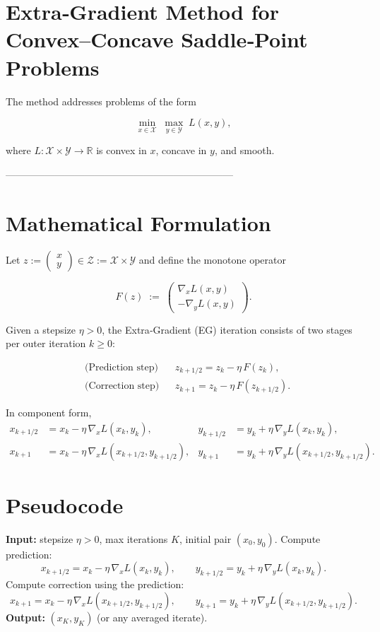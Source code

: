 \documentclass{article}
\newcommand{\R}{\mathbb{R}}
\begin{document}
\section*{Extra‑Gradient Method for Convex–Concave Saddle‑Point Problems}

The method addresses problems of the form  

\[
\min_{x\in\mathcal X}\;\max_{y\in\mathcal Y}\;L(x,y),
\]

where $L:\mathcal X\times\mathcal Y\rightarrow\R$ is convex in $x$, concave in $y$, and smooth.  

---------------------------------------------------------------------

\section*{Mathematical Formulation}
Let $z:=\begin{pmatrix}x\\y\end{pmatrix}\in\mathcal Z:=\mathcal X\times\mathcal Y$ and define the monotone operator  

\[
F(z)\;:=\;
\begin{pmatrix}
\nabla_x L(x,y)\\[2mm]
-\nabla_y L(x,y)
\end{pmatrix}.
\tag{1}
\]

Given a stepsize $\eta>0$, the Extra‑Gradient (EG) iteration consists of two stages per outer iteration $k\ge0$:

\[
\begin{aligned}
&\text{(Prediction step)} && 
z_{k+1/2}=z_k-\eta\,F(z_k),\\[2mm]
&\text{(Correction step)} && 
z_{k+1}=z_k-\eta\,F(z_{k+1/2}).
\end{aligned}
\tag{2}
\]

In component form,
\[
\begin{aligned}
x_{k+1/2}&=x_k-\eta\,\nabla_x L(x_k,y_k), &
y_{k+1/2}&=y_k+\eta\,\nabla_y L(x_k,y_k),\\[1mm]
x_{k+1}&=x_k-\eta\,\nabla_x L(x_{k+1/2},y_{k+1/2}), &
y_{k+1}&=y_k+\eta\,\nabla_y L(x_{k+1/2},y_{k+1/2}).
\end{aligned}
\tag{3}
\]

\section*{Pseudocode}
\begin{algorithm}[H]
\caption{Extra‑Gradient Method}
\begin{algorithmic}[1]
\STATE \textbf{Input:} stepsize $\eta>0$, max iterations $K$, initial pair $(x_0,y_0)$.
    \STATE Compute prediction:
    \[
    x_{k+1/2}=x_k-\eta\,\nabla_x L(x_k,y_k),\qquad
    y_{k+1/2}=y_k+\eta\,\nabla_y L(x_k,y_k).
    \]
    \STATE Compute correction using the prediction:
    \[
    x_{k+1}=x_k-\eta\,\nabla_x L(x_{k+1/2},y_{k+1/2}),\qquad
    y_{k+1}=y_k+\eta\,\nabla_y L(x_{k+1/2},y_{k+1/2}).
    \]
\ENDFOR
\STATE \textbf{Output:} $(x_K,y_K)$ (or any averaged iterate).
\end{algorithmic}
\end{algorithm}
\end{document}

